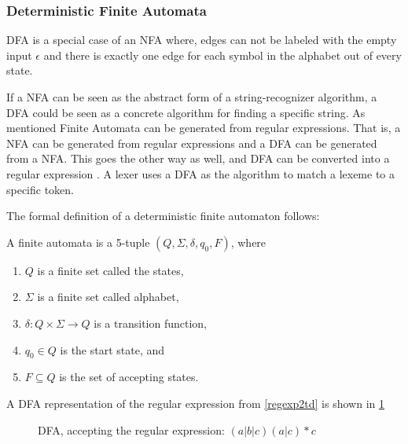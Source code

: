 \subsubsection{Deterministic Finite Automata}
DFA is a special case of an NFA where, edges can not be labeled with the empty
input $\epsilon$ and there is exactly one edge for each symbol in the alphabet
out of every state.

If a NFA can be seen as the abstract form of a string-recognizer algorithm, a
DFA could be seen as a concrete algorithm for finding a specific string. As
mentioned Finite Automata can be generated from regular expressions. That is, a
NFA can be generated from regular expressions and a DFA can be generated from a
NFA. This goes the other way as well, and DFA can be converted into a regular
expression \cite{Aho2006}. A lexer uses a DFA as the algorithm to match a
lexeme to a specific token.

The formal definition of a deterministic finite automaton follows:
\newline
\begin{definition} \label{finiteAutomataDef}
A finite automata is a 5-tuple $(Q, \Sigma, \delta, q_0, F)$, where
\begin{enumerate}
  \item $Q$ is a finite set called the states,
  \item $\Sigma$ is a finite set called alphabet,
  \item $\delta: Q \times \Sigma \to Q$ is a transition function,
  \item $q_0 \in Q$ is the start state, and
  \item $F \subseteq Q$ is the set of accepting states.
\end{enumerate} 
\end{definition}
\hfill 
\break
\begin{example} \label{regexp2dfa}
A DFA representation of the regular expression from \cref{regexp2td} is shown in \cref{fig:dfa}
\end{example}
\begin{figure}[!h]
  \centering
  \caption{DFA, accepting the regular expression: $(a|b|c)(a|c)* c$
  \label{fig:dfa}}
\end{figure}
